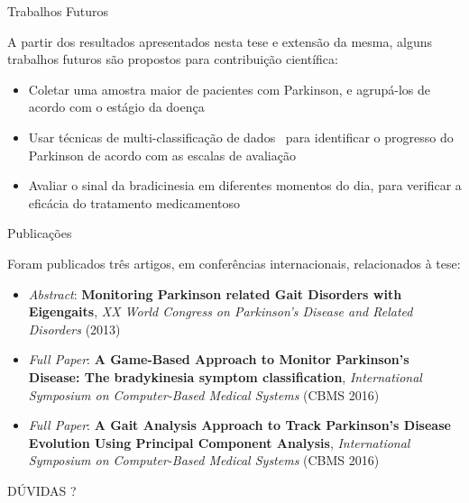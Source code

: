 \documentclass{beamer}
\begin{document}
\begin{frame}{Trabalhos Futuros}
\begin{block}{}
A partir dos resultados apresentados nesta tese e extensão da mesma, alguns trabalhos futuros são propostos para contribuição científica:
  \begin{itemize}
   \item Coletar uma amostra maior de pacientes com Parkinson, e agrupá-los de acordo com o estágio da doença~\cite{goul05}
   \item Usar técnicas de multi-classificação de dados~\cite{multisvm2011} para identificar o progresso do Parkinson de acordo com as escalas de avaliação
   \item Avaliar o sinal da bradicinesia em diferentes momentos do dia, para verificar a eficácia do tratamento medicamentoso~\cite{protpar010}
  \end{itemize}
\end{block}
\end{frame}


\begin{frame}{Publicações}
\begin{block}{}
Foram publicados três artigos, em conferências internacionais, relacionados à tese: 
  \begin{itemize}
   \item \textit{Abstract}: \textbf{Monitoring Parkinson related Gait Disorders with Eigengaits}, \textit{XX World Congress on Parkinson's Disease and Related Disorders} (2013)%
   \item \textit{Full Paper}: \textbf{A Game-Based Approach to Monitor Parkinson’s Disease: The bradykinesia symptom classification}, \textit{International Symposium on Computer-Based Medical Systems} (CBMS 2016)%
   \item \textit{Full Paper}: \textbf{A Gait Analysis Approach to Track Parkinson’s Disease Evolution Using Principal Component Analysis}, \textit{International Symposium on Computer-Based Medical Systems} (CBMS 2016)%
  \end{itemize}
\end{block}
\end{frame}

\begin{frame}
  \begin{center}
  DÚVIDAS ?
  \end{center}
\end{frame}


\end{document}
